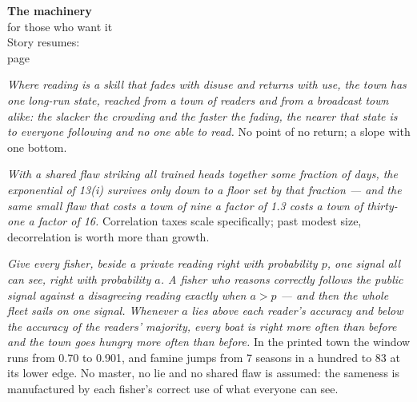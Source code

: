 \begin{machinery}{\textbf{The machinery}\\for those who want it\\[3pt]{\color{muted}Story resumes:\\page~\pageref{ch12}}}

\label{claim-23}

\noindent \emph{Where reading is a
skill that fades with disuse and returns with use, the town has one
long-run state, reached from a town of readers and from a broadcast
town alike: the slacker the crowding and the faster the fading, the
nearer that state is to everyone following and no one able to read.}
No point of no return; a slope with one bottom.


\label{claim-24}

\noindent \emph{With a shared flaw
striking all trained heads together some fraction of days, the
exponential of 13(i) survives only down to a floor set by that
fraction --- and the same small flaw that costs a town of nine a factor
of 1.3 costs a town of thirty-one a factor of 16.} Correlation taxes
scale specifically; past modest size, decorrelation is worth more
than growth.


\label{claim-25}

\noindent \emph{Give every fisher,
beside a private reading right with probability \(p\), one signal all can see, right with probability \(a\). A fisher who reasons correctly follows the public signal against a disagreeing reading exactly when \(a > p\) --- and then the whole fleet sails on one signal. Whenever \(a\) lies above
each reader's accuracy and below the accuracy of the readers' majority,
every boat is right more often than before and the town goes hungry
more often than before.} In the printed town the window runs from 0.70
to 0.901, and famine jumps from 7 seasons in a hundred to 83 at its
lower edge. No master, no lie and no shared flaw is assumed: the
sameness is manufactured by each fisher's correct use of what everyone
can see.


\label{claim-26}


\end{machinery}

